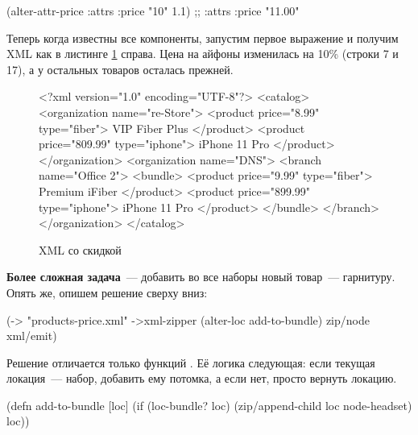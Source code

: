 \begin{english}
  \begin{clojure}
(alter-attr-price {:attrs {:price "10"}} 1.1)
;; {:attrs {:price "11.00"}}
  \end{clojure}
\end{english}

Теперь когда известны все компоненты, запустим первое выражение и получим XML
как в листинге \ref{fig:chart-xml-02} справа. Цена на айфоны изменилась на 10\%
(строки 7 и 17), а у остальных товаров осталась прежней.

\begin{figure}[ht!]

\begin{english}
  \begin{xml/lines}
<?xml version="1.0" encoding="UTF-8"?>
<catalog>
  <organization name="re-Store">
    <product price="8.99" type="fiber">
      VIP Fiber Plus
    </product>
    <product price="809.99" type="iphone">
      iPhone 11 Pro
    </product>
  </organization>
  <organization name="DNS">
    <branch name="Office 2">
      <bundle>
        <product price="9.99" type="fiber">
          Premium iFiber
        </product>
        <product price="899.99" type="iphone">
          iPhone 11 Pro
        </product>
      </bundle>
    </branch>
  </organization>
</catalog>
  \end{xml/lines}
\end{english}

\captionsetup{labelformat=lis}
\caption{XML со скидкой}

\label{fig:chart-xml-02}

\end{figure}

\textbf{Более сложная задача}~--- добавить во все наборы новый товар~---
гарнитуру. Опять же, опишем решение сверху вниз:

\begin{english}
  \begin{clojure}
(-> "products-price.xml"
    ->xml-zipper
    (alter-loc add-to-bundle)
    zip/node
    xml/emit)
  \end{clojure}
\end{english}

Решение отличается только функций . Её логика следующая: если
текущая локация~--- набор, добавить ему потомка, а если нет, просто вернуть
локацию.

\begin{english}
  \begin{clojure}
(defn add-to-bundle [loc]
  (if (loc-bundle? loc)
    (zip/append-child loc node-headset)
    loc))
  \end{clojure}
\end{english}

